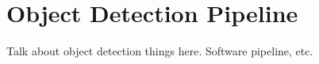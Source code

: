 \chapter{Object Detection Pipeline}

Talk about object detection things here. Software pipeline, etc.
